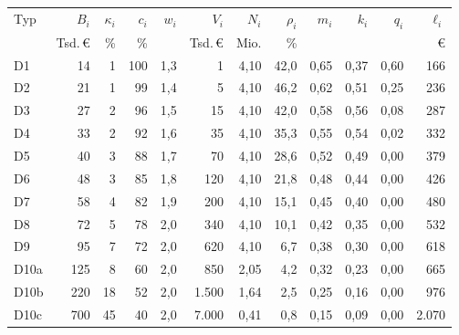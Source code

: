 \begin{tabular}{@{}lrrrrrrrrrrr@{}}
\toprule
Typ & $B_i$ & $\kappa_i$ & $c_i$ & $w_i$ & $V_i$ & $N_i$ & $\rho_i$ & $m_i$ & $k_i$ & $q_i$ & $\ell_i$ \\
 & Tsd.\,\euro{} & \% & \% & & Tsd.\,\euro{} & Mio. & \% & & & & \euro{} \\
\midrule
D1 & 14 & 1 & 100 & 1,3 & 1 & 4,10 & 42,0 & 0,65 & 0,37 & 0,60 & 166 \\
D2 & 21 & 1 & 99 & 1,4 & 5 & 4,10 & 46,2 & 0,62 & 0,51 & 0,25 & 236 \\
D3 & 27 & 2 & 96 & 1,5 & 15 & 4,10 & 42,0 & 0,58 & 0,56 & 0,08 & 287 \\
D4 & 33 & 2 & 92 & 1,6 & 35 & 4,10 & 35,3 & 0,55 & 0,54 & 0,02 & 332 \\
D5 & 40 & 3 & 88 & 1,7 & 70 & 4,10 & 28,6 & 0,52 & 0,49 & 0,00 & 379 \\
D6 & 48 & 3 & 85 & 1,8 & 120 & 4,10 & 21,8 & 0,48 & 0,44 & 0,00 & 426 \\
D7 & 58 & 4 & 82 & 1,9 & 200 & 4,10 & 15,1 & 0,45 & 0,40 & 0,00 & 480 \\
D8 & 72 & 5 & 78 & 2,0 & 340 & 4,10 & 10,1 & 0,42 & 0,35 & 0,00 & 532 \\
D9 & 95 & 7 & 72 & 2,0 & 620 & 4,10 & 6,7 & 0,38 & 0,30 & 0,00 & 618 \\
D10a & 125 & 8 & 60 & 2,0 & 850 & 2,05 & 4,2 & 0,32 & 0,23 & 0,00 & 665 \\
D10b & 220 & 18 & 52 & 2,0 & 1.500 & 1,64 & 2,5 & 0,25 & 0,16 & 0,00 & 976 \\
D10c & 700 & 45 & 40 & 2,0 & 7.000 & 0,41 & 0,8 & 0,15 & 0,09 & 0,00 & 2.070 \\
\bottomrule
\end{tabular}
